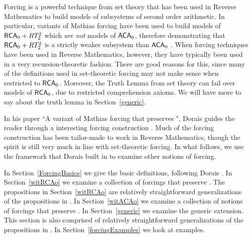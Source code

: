 Forcing is a powerful technique from set theory that
has been used in Reverse Mathematics to build models of
subsystems of second order arithmetic.
In particular, variants of Mathias forcing have been
used to build models of $\mathsf{RCA}_0+RT^2_2$ which \textit{are not}
models of $\mathsf{ACA}_0$, therefore demonstrating that $\mathsf{RCA}_0+RT^2_2$
is a strictly weaker subsystem than $\mathsf{ACA}_0$ \cite{CJS}.
When forcing techniques have been used in Reverse Mathematics,
however, they have typically been used in a very recursion-theoretic fashion.
There are good reasons for this, since many of the definitions
used in set-theoretic forcing may not make sense when restricted to $\mathsf{RCA}_0$.
Moreover, the Truth Lemma from set theory can fail over models of $\mathsf{RCA}_0$,
due to restricted comprehension axioms.
We will have more to say about the truth lemma in Section~\ref{generic}.

In his paper ``A variant of Mathias forcing that
preserves \ACAo", Dorais guides the reader through a
interesting forcing construction \cite{varMathias}.
Much of the forcing construction has been tailor-made to work
in Reverse Mathematics, though the spirit is
still very much in line with set-theoretic forcing.
In what follows, we use the framework that Dorais
built in \cite{varMathias} to examine other notions of forcing.

In Section~\ref{ForcingBasics} we give the basic definitions,
following Dorais \cite{varMathias}.
In Section~\ref{witRCAo} we examine a collection of forcings
that preserve \RCAo.
The propositions in Section~\ref{witRCAo} are relatively straightforward generalizations
of the propositions in \cite{varMathias}.
In Section~\ref{witACAo} we examine a collection of notions of forcings
that preserve \ACAo.
In Section~\ref{generic} we examine the generic extension.
This section is also comprised of relatively straightforward generalizations
of the propositions in \cite{varMathias}.
In Section~\ref{forcingExamples} we look at examples.
